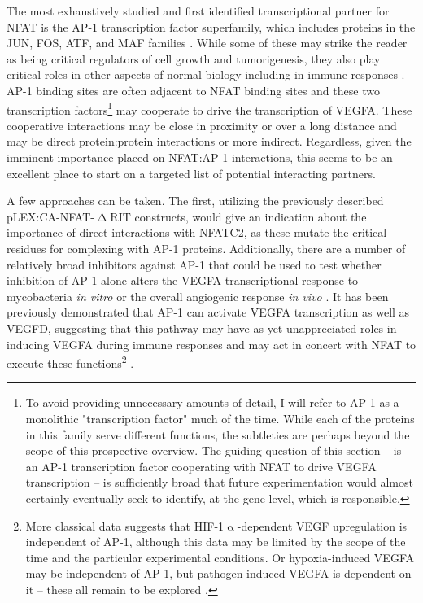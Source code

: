 The most exhaustively studied and first identified transcriptional partner for NFAT is the AP-1 transcription factor superfamily, which includes proteins in the JUN, FOS, ATF, and MAF families \citep{Boise1993}. While some of these may strike the reader as being critical regulators of cell growth and tumorigenesis, they also play critical roles in other aspects of normal biology including in immune responses \citep{Macian2001, Eferl2003}. AP-1 binding sites are often adjacent to NFAT binding sites and these two transcription factors\footnote{To avoid providing unnecessary amounts of detail, I will refer to AP-1 as a monolithic "transcription factor" much of the time. While each of the proteins in this family serve different functions, the subtleties are perhaps beyond the scope of this prospective overview. The guiding question of this section -- is an AP-1 transcription factor cooperating with NFAT to drive VEGFA transcription -- is sufficiently broad that future experimentation would almost certainly eventually seek to identify, at the gene level, which is responsible.} may cooperate to drive the transcription of VEGFA. These cooperative interactions may be close in proximity or over a long distance and may be direct protein:protein interactions or more indirect. Regardless, given the imminent importance placed on NFAT:AP-1 interactions, this seems to be an excellent place to start on a targeted list of potential interacting partners.

A few approaches can be taken. The first, utilizing the previously described pLEX:CA-NFAT-$\upDelta$RIT constructs, would give an indication about the importance of direct interactions with NFATC2, as these mutate the critical residues for complexing with AP-1 proteins. Additionally, there are a number of relatively broad inhibitors against AP-1 that could be used to test whether inhibition of AP-1 alone alters the VEGFA transcriptional response to mycobacteria \textit{in vitro} or the overall angiogenic response \textit{in vivo} \citep{Makino2017, Huang1997}. It has been previously demonstrated that AP-1 can activate VEGFA transcription as well as VEGFD, suggesting that this pathway may have as-yet unappreciated roles in inducing VEGFA during immune responses and may act in concert with NFAT to execute these functions\footnote{More classical data suggests that HIF-1$\upalpha$-dependent VEGF upregulation is independent of AP-1, although this data may be limited by the scope of the time and the particular experimental conditions. Or hypoxia-induced VEGFA may be independent of AP-1, but pathogen-induced VEGFA is dependent on it -- these all remain to be explored \citep{Finkenzeller1995}.} \citep{Shih2001, Debinski2001, Wang2016, Josko2004, Guo2022}.

